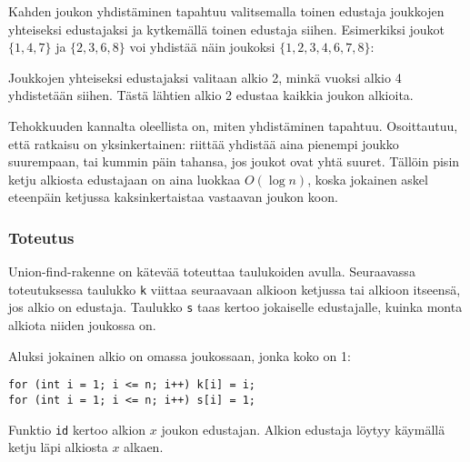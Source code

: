 Kahden joukon yhdistäminen tapahtuu
valitsemalla toinen edustaja
joukkojen yhteiseksi edustajaksi
ja kytkemällä toinen edustaja siihen.
Esimerkiksi joukot $\{1,4,7\}$ ja $\{2,3,6,8\}$
voi yhdistää näin joukoksi $\{1,2,3,4,6,7,8\}$:
\begin{center}
\end{center}

Joukkojen yhteiseksi edustajaksi valitaan alkio 2,
minkä vuoksi alkio 4 yhdistetään siihen.
Tästä lähtien alkio 2 edustaa kaikkia joukon alkioita.

Tehokkuuden kannalta oleellista on,
miten yhdistäminen tapahtuu.
Osoittautuu, että ratkaisu on yksinkertainen:
riittää yhdistää aina pienempi joukko suurempaan,
tai kummin päin tahansa,
jos joukot ovat yhtä suuret.
Tällöin pisin ketju
alkiosta edustajaan on aina luokkaa $O(\log n)$,
koska jokainen askel eteenpäin
ketjussa kaksinkertaistaa
vastaavan joukon koon.

\subsubsection{Toteutus}

Union-find-rakenne on kätevää toteuttaa
taulukoiden avulla.
Seuraavassa toteutuksessa taulukko \texttt{k}
viittaa seuraavaan alkioon ketjussa
tai alkioon itseensä, jos alkio on edustaja.
Taulukko \texttt{s} taas kertoo jokaiselle edustajalle,
kuinka monta alkiota niiden joukossa on.

Aluksi jokainen alkio on omassa joukossaan,
jonka koko on 1:

\begin{lstlisting}
for (int i = 1; i <= n; i++) k[i] = i;
for (int i = 1; i <= n; i++) s[i] = 1;
\end{lstlisting}

Funktio \texttt{id} kertoo alkion $x$
joukon edustajan. Alkion edustaja löytyy
käymällä ketju läpi alkiosta $x$ alkaen.

